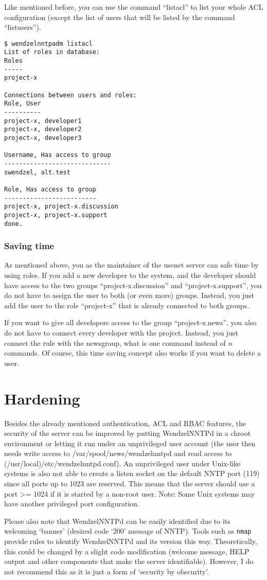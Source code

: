 Like mentioned before, you can use the command ``listacl'' to list your whole ACL configuration (except the list of users that will be listed by the command ``listusers'').

\begin{verbatim}
$ wendzelnntpadm listacl
List of roles in database:
Roles
-----
project-x

Connections between users and roles:
Role, User
----------
project-x, developer1
project-x, developer2
project-x, developer3

Username, Has access to group
-----------------------------
swendzel, alt.test

Role, Has access to group
-------------------------
project-x, project-x.discussion
project-x, project-x.support
done.
\end{verbatim}

\subsubsection{Saving time}

As mentioned above, you as the maintainer of the usenet server can safe time by using roles. If you add a new developer to the system, and the developer should have access to the two groups ``project-x.discussion'' and ``project-x.support'', you do not have to assign the user to both (or even more) groups. Instead, you just add the user to the role ``project-x'' that is already connected to both groups.

If you want to give all developers access to the group ``project-x.news'', you also do not have to connect every developer with the project. Instead, you just connect the rule with the newsgroup, what is one command instead of $n$ commands. Of course, this time saving concept also works if you want to delete a user.

\section{Hardening}

Besides the already mentioned authentication, ACL and RBAC features, the security of the server can be improved by putting WendzelNNTPd in a chroot environment or letting it run under an unprivileged user account (the user then needs write access to /var/spool/news/wendzelnntpd and read access to (/usr/local)/etc/wendzelnntpd.conf). An unprivileged user under Unix-like systems is also not able to create a listen socket on the default NNTP port (119) since all ports up to 1023 are reserved. This means that the server should use a port >= 1024 if it is started by a non-root user. Note: Some Unix systems may have another privileged port configuration. 

Please also note that WendzelNNTPd can be easily identified due to its welcoming `banner' (desired code `200' message of NNTP). Tools such as \texttt{nmap} provide rules to identify WendzelNNTPd and its version this way. Theoretically, this could be changed by a slight code modification (welcome message, HELP output and other components that make the server identifiable). However, I do not recommend this as it is just a form of `security by obscurity'.

